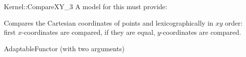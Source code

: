 \begin{ccRefFunctionObjectConcept}{Kernel::CompareXY_3}
A model for this must provide:


      {Compares the Cartesian coordinates of points  and
        lexicographically in $xy$ order: first 
       $x$-coordinates are compared, if they are equal, $y$-coordinates
       are compared.}

\ccRefines
AdaptableFunctor (with two arguments)

\ccSeeAlso
{}  \\

\end{ccRefFunctionObjectConcept}
